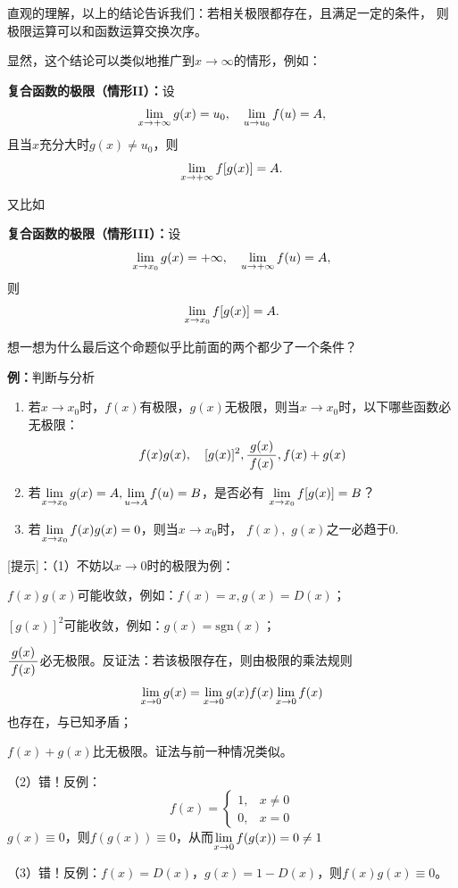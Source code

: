 直观的理解，以上的结论告诉我们：若相关极限都存在，且满足一定的条件，
则极限运算可以和函数运算交换次序。

显然，这个结论可以类似地推广到$x\to\infty$的情形，例如：

\begin{thx}
	{\bf 复合函数的极限（情形II）：}设
	$$\lim\limits_{x\to{+\infty}}g(x)=u_0,\quad\lim\limits_{u\to u_0}f(u)=A,$$
	且当$x$充分大时$g(x)\ne u_0$，则
	$$\lim\limits_{x\to{+\infty}}f[g(x)]=A.$$
\end{thx}
又比如
\begin{thx}
	{\bf 复合函数的极限（情形III）：}设
	$$\lim\limits_{x\to{x_0}}g(x)=+\infty,\quad\lim\limits_{u\to+\infty}f(u)=A,$$
	则
	$$\lim\limits_{x\to{x_0}}f[g(x)]=A.$$
\end{thx}
想一想为什么最后这个命题似乎比前面的两个都少了一个条件？

{\bf 例：}判断与分析
\begin{enumerate}[(1)]
  \setlength{\itemindent}{1cm}
  \item 若$x\to x_0$时，$f(x)$有极限，$g(x)$无极限，则当$x\to x_0$时，以下哪些函数必无极限：
  $$f(x)g(x),\quad [g(x)]^2,\displaystyle\frac{\,{g(x)}\,}{\,{f(x)}\,}, f(x)+g(x)$$ 
  \item 若$\lim\limits_{x\to{x_0}}g(x)=A,\lim\limits_{u\to A}f(u)=B$，是否必有
  $\lim\limits_{x\to{x_0}}f[g(x)]=B$？
  \item 若$\lim\limits_{x\to{x_0}}f(x)g(x)=0$，则当$x\to
  x_0$时， $f(x),$ $g(x)$之一必趋于$0$.
\end{enumerate}

[提示]：（1）不妨以$x\to0$时的极限为例：

$f(x)g(x)$可能收敛，例如：$f(x)=x,g(x)=D(x)$；

$[g(x)]^2$可能收敛，例如：$g(x)=\mathrm{sgn}(x)$；

$\displaystyle\frac{\,{g(x)}\,}{\,{f(x)}\,}$必无极限。反证法：若该极限存在，则由极限的乘法规则
$$\lim\limits_{x\to{0}}g(x)=\lim\limits_{x\to{0}}{g(x)}{f(x)}\lim\limits_{x\to{0}}f(x)$$
也存在，与已知矛盾；

$f(x)+g(x)$比无极限。证法与前一种情况类似。

（2）错！反例：
$$f(x)=\left\{\begin{array}{ll}
  1,&x\ne0\\0,&x=0
\end{array}\right.$$
$g(x)\equiv 0$，则$f(g(x))\equiv0$，从而$\lim\limits_{x\to{0}}f(g(x))=0\ne 1$

（3）错！反例：$f(x)=D(x)$，$g(x)=1-D(x)$，则$f(x)g(x)\equiv 0$。

